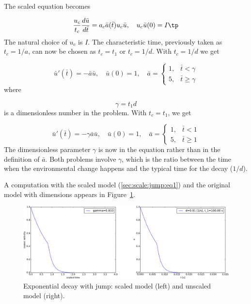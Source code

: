 \documentclass[graybox,envcountchap,sectrefs,final]{svmonodo}
\begin{document}

The scaled equation becomes

\[ \frac{u_c}{t_c}\frac{d\bar u}{d\bar t} = a_c\bar a(\bar t) u_c\bar u,\quad
u_c\bar u(0) = I\tp\]
The natural choice of $u_c$ is $I$.
The characteristic time, previously taken as $t_c=1/a$, can now be
chosen as $t_c=t_1$ or $t_c=1/d$.
With $t_c=1/d$ we get

\begin{equation}
\bar u'(\bar t)=-\bar a\bar u,\quad \bar u(0)=1,\quad
\bar a = \left\lbrace\begin{array}{ll}
1, & \bar t < \gamma\\ 
5, & \bar t \geq \gamma
\end{array}\right.
\label{sec:scale:jump:eq1}
\end{equation}
where

\[ \gamma = t_1 d\]
is a dimensionless number in the problem. With $t_c=t_1$, we get

\[ \bar u'(\bar t)=-\gamma\bar a\bar u,\quad \bar u(0)=1,\quad
\bar a = \left\lbrace\begin{array}{ll}
1, & \bar t < 1\\ 
5, & \bar t \geq 1
\end{array}\right.\]
The dimensionless parameter $\gamma$ is now in the equation rather than in
the definition of $\bar a$. Both problems involve $\gamma$, which
is the ratio between the time when the environmental change happens
and the typical time for the decay ($1/d$).

A computation with the scaled model (\ref{sec:scale:jump:eq1})
and the original model with dimensions appears in
Figure~\ref{sec:scale:jump:fig}.


\begin{figure}[!ht]  %
  \centerline{\includegraphics[width=1.0\linewidth]{fig-scaling/decay_jump.pdf}}
  \caption{
  Exponential decay with jump: scaled model (left) and unscaled model (right). \label{sec:scale:jump:fig}
  }
\end{figure}
\end{document}
